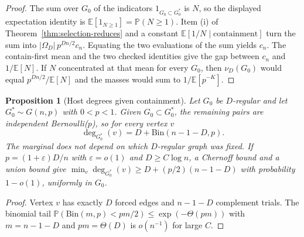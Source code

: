 \documentclass[11pt]{article}
\newtheorem{proposition}[theorem]{Proposition}
\newcommand{\EE}{\mathbb{E}}
\newcommand{\PP}{\mathbb{P}}
\begin{document}
\begin{proof}
The sum over \(G_0\) of the indicators \(1_{G_0\subset G^*_0}\) is \(N\),
so the displayed expectation identity is
\(\EE[1_{N\ge 1}]=\PP(N\ge 1)\).
Item (i) of Theorem~\ref{thm:selection-reduces} and a constant
\(\EE[1/N\mid\text{containment}]\) turn the sum into
\(\lvert\Omega_D\rvert\,p^{Dn/2}c_n\).
Equating the two evaluations of the sum yields \(c_n\).
The contain-first mean and the two checked identities give the gap
between \(c_n\) and \(1/\EE[N]\).
If \(N\) concentrated at that mean for every \(G_0\), then
\(\nu_D(G_0)\) would equal \(p^{Dn/2}/\EE[N]\) and the masses would sum
to \(1/\EE[p^{-K}]\).
\end{proof}

\begin{proposition}[Host degrees given containment]
\label{prop:host-degree-marginal}
Let \(G_0\) be \(D\)-regular and let \(G^*_0\sim G(n,p)\) with
\(0<p<1\).
Given \(G_0\subset G^*_0\), the remaining pairs are independent
Bernoulli(\(p\)), so for every vertex \(v\)
\[
\deg_{G^*_0}(v)
=
D+\mathrm{Bin}(n-1-D,p).
\]
The marginal does not depend on which \(D\)-regular graph was fixed.
If \(p=(1+\varepsilon)D/n\) with \(\varepsilon=o(1)\) and
\(D\ge C\log n\), a Chernoff bound and a union bound give
\(\min_v\deg_{G^*_0}(v)\ge D+(p/2)(n-1-D)\) with probability \(1-o(1)\),
uniformly in \(G_0\).
\end{proposition}

\begin{proof}
Vertex \(v\) has exactly \(D\) forced edges and \(n-1-D\) complement
trials.
The binomial tail \(\PP(\mathrm{Bin}(m,p)<pm/2)\le\exp(-\Theta(pm))\)
with \(m=n-1-D\) and \(pm=\Theta(D)\) is \(o(n^{-1})\) for large \(C\).
\end{proof}
\end{document}

